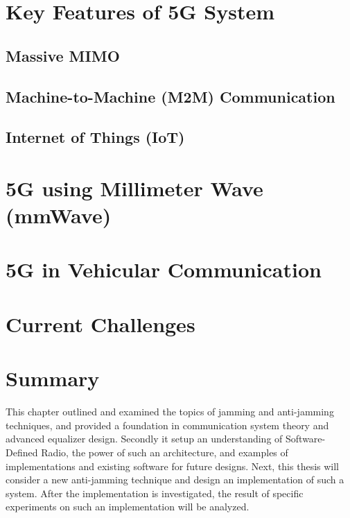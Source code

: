 \section{Key Features of 5G System}
\subsection{Massive MIMO}
\subsection{Machine-to-Machine (M2M) Communication}
\subsection{Internet of Things (IoT)}

\section{5G using Millimeter Wave (mmWave)}

\section{5G in Vehicular Communication}

\section{Current Challenges}

\section{Summary}
This chapter outlined and examined the topics of jamming and anti-jamming techniques, and provided a foundation in communication system theory and advanced equalizer design.  Secondly it setup an understanding of Software-Defined Radio, the power of such an architecture, and examples of implementations and existing software for future designs.  Next, this thesis will consider a new anti-jamming technique and design an implementation of such a system.  After the implementation is investigated, the result of specific experiments on such an implementation will be analyzed.\\
